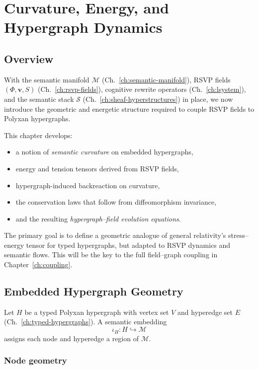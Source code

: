\chapter{Curvature, Energy, and Hypergraph Dynamics}
\label{ch:curvature-hypergraph}

\section{Overview}

With the semantic manifold $\mathcal{M}$ (Ch.~\ref{ch:semantic-manifold}),
RSVP fields $(\Phi,\mathbf{v},S)$ (Ch.~\ref{ch:rsvp-fields}),
cognitive rewrite operators (Ch.~\ref{ch:lsystem}),
and the semantic stack $\mathcal{S}$ (Ch.~\ref{ch:sheaf-hyperstructures})
in place, we now introduce the geometric and energetic structure required to
couple RSVP fields to Polyxan hypergraphs.

This chapter develops:
\begin{itemize}
  \item a notion of \emph{semantic curvature} on embedded hypergraphs,
  \item energy and tension tensors derived from RSVP fields,
  \item hypergraph-induced backreaction on curvature,
  \item the conservation laws that follow from diffeomorphism invariance,
  \item and the resulting \emph{hypergraph–field evolution equations}.
\end{itemize}

The primary goal is to define a geometric analogue of general relativity’s
stress–energy tensor for typed hypergraphs, but adapted to RSVP dynamics and
semantic flows. This will be the key to the full field–graph coupling in
Chapter~\ref{ch:coupling}.

\section{Embedded Hypergraph Geometry}

Let $H$ be a typed Polyxan hypergraph with vertex set $V$ and hyperedge set
$E$ (Ch.~\ref{ch:typed-hypergraphs}).  
A semantic embedding
\[
\iota_H : H \hookrightarrow \mathcal{M}
\]
assigns each node and hyperedge a region of $\mathcal{M}$.

\subsection{Node geometry}

